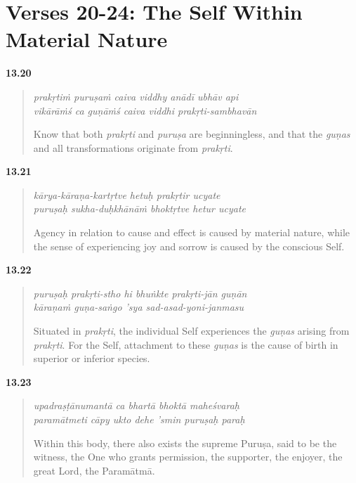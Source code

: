 \section{Verses 20-24: The Self Within Material Nature}\label{sec-verses-20-24-the-self-within-material-nature}


\par\noindent\textbf{13.20}\par
\begin{verse}
\textit{prakṛtiṁ puruṣaṁ caiva viddhy anādī ubhāv api} \\
\textit{vikārāṁś ca guṇāṁś caiva viddhi prakṛti-sambhavān}

\noindent Know that both \textit{prakṛti} and \textit{puruṣa} are beginningless, and that the \textit{guṇas} and all transformations originate from \textit{prakṛti}.
\end{verse}
\par



\par\noindent\textbf{13.21}\par
\begin{verse}
\textit{kārya-kāraṇa-kartṛtve hetuḥ prakṛtir ucyate} \\
\textit{puruṣaḥ sukha-duḥkhānāṁ bhoktṛtve hetur ucyate}

\noindent Agency in relation to cause and effect is caused by material nature, while the sense of experiencing joy and sorrow is caused by the conscious Self.
\end{verse}
\par



\par\noindent\textbf{13.22}\par
\begin{verse}
\textit{puruṣaḥ prakṛti-stho hi bhuṅkte prakṛti-jān guṇān} \\
\textit{kāraṇaṁ guṇa-saṅgo ’sya sad-asad-yoni-janmasu}

\noindent Situated in \textit{prakṛti}, the individual Self experiences the \textit{guṇas} arising from \textit{prakṛti}. For the Self, attachment to these \textit{guṇas} is the cause of birth in superior or inferior species.
\end{verse}
\par



\par\noindent\textbf{13.23}\par
\begin{verse}
\textit{upadraṣṭānumantā ca bhartā bhoktā maheśvaraḥ} \\
\textit{paramātmeti cāpy ukto dehe ’smin puruṣaḥ paraḥ}

\noindent Within this body, there also exists the supreme Puruṣa, said to be the witness, the One who grants permission, the supporter, the enjoyer, the great Lord, the Paramātmā.
\end{verse}
\par



